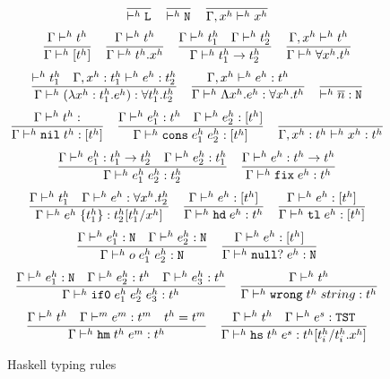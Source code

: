 \begin{figure}[p]
\[
\frac
{}
{ \vdash^{h} \mathtt{L}}
\quad
\frac
{}
{ \vdash^{h} \mathtt{N}}
\quad
\frac
{}
{\Gamma , x^{h} \vdash^{h} x^{h}}
\]
\[
\frac
{\Gamma \vdash^{h} t^{h}}
{\Gamma \vdash^{h} [t^{h}]}
\quad
\frac
{\Gamma \vdash^{h} t^{h}}
{\Gamma \vdash^{h} t^{h} . x^{h}}
\quad
\frac
{\Gamma \vdash^{h} t^{h}_{1} \quad \Gamma \vdash^{h} t^{h}_{2}}
{\Gamma \vdash^{h} t^{h}_{1} \rightarrow t^{h}_{2}}
\quad
\frac
{\Gamma, x^{h} \vdash^{h} t^{h}}
{\Gamma \vdash^{h} \forall x^{h} . t^{h}}
\]
\bigskip
\[
\frac
{ \vdash^{h} t^{h}_{1} \quad \Gamma , x^{h} : t^{h}_{1} \vdash^{h} e^{h} : t^{h}_{2}}
{\Gamma \vdash^{h} (\lambda x^{h} : t^{h}_{1} . e^{h}) : \forall t^{h}_{1} . t^{h}_{2}}
\quad
\frac
{\Gamma , x^{h} \vdash^{h} e^{h} : t^{h}}
{\Gamma \vdash^{h} \Lambda x^{h} . e^{h} : \forall x^{h} . t^{h}}
\quad
\frac
{}
{ \vdash^{h} \overline{n} : \mathtt{N}}
\]
\[
\frac
{\judeh{\env}{\vartyh}}
{\judeh{\env}{\expnil{\vartyh}}{\tylist{\vartyh}}}
\quad
\frac
{\judeh{\env}{\first{\varexph}}{\vartyh} \quad \judeh{\env}{\second{\varexph}}{\tylist{\vartyh}}}
{\judeh{\env}{\expcons{\first{\varexph}}{\second{\varexph}}}{\tylist{\vartyh}}}
\quad
\frac
{}
{\judeh{\envexte{\tyvarh}{\vartyh}}{\tyvarh}{\vartyh}}
\]
\[
\frac
{\Gamma \vdash^{h} e^{h}_{1} : t^{h}_{1} \rightarrow t^{h}_{2} \quad \Gamma \vdash^{h} e^{h}_{2} : t^{h}_{1}}
{\Gamma\vdash^{h}e^{h}_{1} \; e^{h}_{2}:t^{h}_2}
\quad
\frac
{\Gamma \vdash^{h} e^{h} : t^{h} \rightarrow t^{h}}
{\Gamma \vdash^{h} \mathtt{fix} \; e^{h} : t^{h}}
\]
\[
\frac
{\Gamma \vdash^{h} t^{h}_{1} \quad \Gamma \vdash^{h} e^{h} : \forall x^{h} . t^{h}_{2}}
{\Gamma \vdash^{h} e^{h} \; \lbrace t^{h}_{1} \rbrace : t^{h}_{2}[t^{h}_{1}/x^{h}]}
\quad
\frac
{\Gamma \vdash^{h} e^{h} : [t^{h}]}
{\Gamma \vdash^{h} \mathtt{hd} \; e^{h} : t^{h}}
\quad
\frac
{\Gamma \vdash^{h} e^{h} : [t^{h}]}
{\Gamma \vdash^{h} \mathtt{tl} \; e^{h} : [t^{h}]}
\]
\[
\frac
{\Gamma \vdash^{h} e^{h}_{1} : \mathtt{N} \quad \Gamma \vdash^{h} e^{h}_{2} : \mathtt{N}}
{\Gamma \vdash^{h} o \; e^{h}_{1} \; e^{h}_{2} : \mathtt{N}}
\quad
\frac
{\Gamma \vdash^{h} e^{h} : [t^{h}]}
{\Gamma \vdash^{h} \mathtt{null?} \; e^{h} : \mathtt{N}}
\]
\[
\frac
{\Gamma \vdash^{h} e^{h}_{1} : \mathtt{N} \quad \Gamma \vdash^{h} e^{h}_{2} : t^{h} \quad \Gamma \vdash^{h} e^{h}_{3} : t^{h}}
{\Gamma \vdash^{h} \mathtt{if0} \; e^{h}_{1} \; e^{h}_{2} \; e^{h}_{3} : t^{h}}
\quad
\frac
{\Gamma \vdash^{h} t^{h}}
{\Gamma \vdash^{h} \mathtt{wrong} \; t^{h} \; string : t^{h}}
\]
\[
\frac
{\Gamma \vdash^{h} t^{h} \quad \Gamma \vdash^{m} e^{m} : t^{m} \quad t^{h}=t^{m}}
{\Gamma \vdash^{h} \mathtt{hm} \; t^{h} \; e^{m} : t^{h}}
\quad
\frac
{\Gamma \vdash^{h} t^{h} \quad \Gamma \vdash^{h} e^{s} : \mathtt{TST}}
{\Gamma \vdash^{h} \mathtt{hs} \; t^{h} \; e^{s} : t^{h}[t^{h}_{i}/t^{h}_{i} . x^{h}]}
\]
\caption{Haskell typing rules}
\label{htr}
\end{figure}
